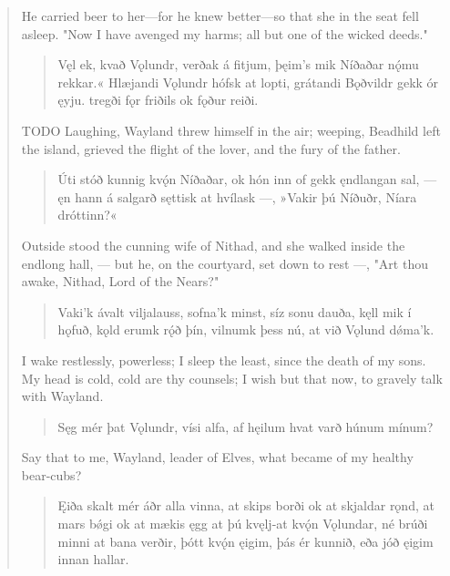 \begin{verse}
\bvb He carried beer to her—for he knew better—so that she in the seat fell asleep. "Now I have avenged my harms; all but one of the wicked deeds."

\begin{verse}
\bva Vęl ek, kvað Vǫlundr, \hld verðak á fitjum,
þęim's mik Níðaðar \hld nǫ́mu rekkar.« 
Hlæjandi Vǫlundr \hld hófsk at lopti,
grátandi Bǫðvildr \hld gekk ór ęyju.
tregði fǫr friðils \hld ok fǫður reiði. \\%
\end{verse}

\bvb TODO Laughing, Wayland threw himself in the air; weeping, Beadhild left the island, grieved the flight of the lover, and the fury of the father.

\begin{verse}
\bva Úti stóð kunnig \hld kvǫ́n Níðaðar,
ok hón inn of gekk \hld ęndlangan sal,
— ęn hann á salgarð \hld sęttisk at hvílask —,
»Vakir þú Níðuðr, \hld Níara dróttinn?«  \\%
\end{verse}

\bvb Outside stood the cunning wife of Nithad, and she walked inside the endlong hall, — but he, on the courtyard, set down to rest —, "Art thou awake, Nithad, Lord of the Nears?"

\begin{verse}
\bva Vaki'k ávalt \hld viljalauss,
sofna'k minst, \hld síz sonu dauða,
kęll mik í hǫfuð, \hld kǫld erumk rǫ́ð þín,
vilnumk þess nú, \hld at við Vǫlund dǿma'k. \\%
\end{verse}

\bvb I wake restlessly, powerless; I sleep the least, since the death of my sons. My head is cold, cold are thy counsels; I wish but that now, to gravely talk with Wayland.

\begin{verse}
\bva Sęg mér þat Vǫlundr, \hld vísi alfa,
af hęilum hvat varð \hld húnum mínum? \\%
\end{verse}

\bvb Say that to me, Wayland, leader of Elves, what became of my healthy bear-cubs?

\begin{verse}
\bva Ęiða skalt mér áðr \hld alla vinna,
at skips borði \hld ok at skjaldar rǫnd,
at mars bǿgi \hld ok at mækis ęgg
at þú kvęlj-at \hld kvǫ́n Vǫlundar,
né brúði minni \hld at bana verðir,
þótt kvǫ́n ęigim, \hld þás ér kunnið,
eða jóð ęigim \hld innan hallar. \\%
\end{verse}


\end{verse}
